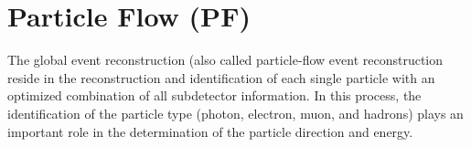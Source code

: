 

\section{Particle Flow (PF) }

The global event reconstruction (also called particle-flow event reconstruction reside in the reconstruction and identification of each single particle with an optimized combination of all subdetector information. In this process, the identification of the particle type (photon, electron, muon, and hadrons) plays an important role in the determination of the particle direction and energy.
 
